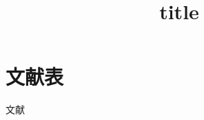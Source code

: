 \documentclass[twoside]{article}
\begin{document}
\title{title}
\maketitle
\clearpage

\section{文献表}

文献\cite{易仕和2013--}

\newpage
\printbibliography
\end{document}

